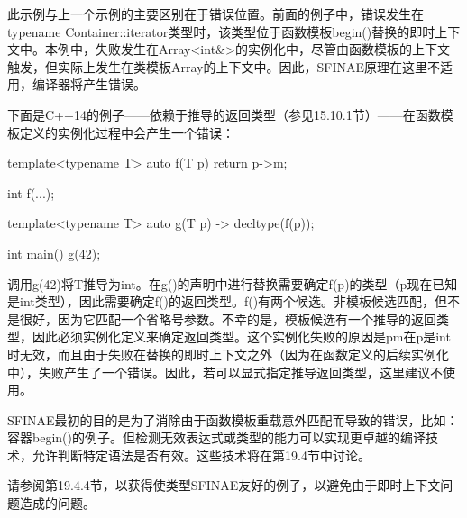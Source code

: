 此示例与上一个示例的主要区别在于错误位置。前面的例子中，错误发生在typename Container::iterator类型时，该类型位于函数模板begin()替换的即时上下文中。本例中，失败发生在Array<int\&>的实例化中，尽管由函数模板的上下文触发，但实际上发生在类模板Array的上下文中。因此，SFINAE原理在这里不适用，编译器将产生错误。

下面是C++14的例子——依赖于推导的返回类型（参见15.10.1节）——在函数模板定义的实例化过程中会产生一个错误：

\begin{cpp}
template<typename T> auto f(T p) {
	return p->m;
}

int f(...);

template<typename T> auto g(T p) -> decltype(f(p));

int main() {
	g(42);
}
\end{cpp}

调用g(42)将T推导为int。在g()的声明中进行替换需要确定f(p)的类型（p现在已知是int类型），因此需要确定f()的返回类型。f()有两个候选。非模板候选匹配，但不是很好，因为它匹配一个省略号参数。不幸的是，模板候选有一个推导的返回类型，因此必须实例化定义来确定返回类型。这个实例化失败的原因是p\inlcpp{->}m在p是int时无效，而且由于失败在替换的即时上下文之外（因为在函数定义的后续实例化中），失败产生了一个错误。因此，若可以显式指定推导返回类型，这里建议不使用。

SFINAE最初的目的是为了消除由于函数模板重载意外匹配而导致的错误，比如：容器begin()的例子。但检测无效表达式或类型的能力可以实现更卓越的编译技术，允许判断特定语法是否有效。这些技术将在第19.4节中讨论。

请参阅第19.4.4节，以获得使类型SFINAE友好的例子，以避免由于即时上下文问题造成的问题。



